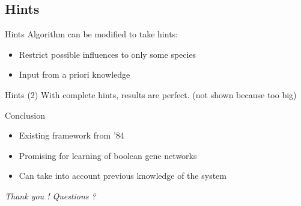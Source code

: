\documentclass{beamer}
\begin{document}
\subsection{Hints}
\begin{frame}{Hints}
	Algorithm can be modified to take hints:
	\begin{itemize}
		\item Restrict possible influences to only some species
		\item Input from a priori knowledge
	\end{itemize}
\end{frame}
\begin{frame}{Hints (2)}
	With complete hints, results are perfect. (not shown because too big)
\end{frame}
\begin{frame}{Conclusion}
\begin{itemize}
	\item Existing framework from '84
	\item Promising for learning of boolean gene networks
	\item Can take into account previous knowledge of the system
\end{itemize}

\centering
\textit{Thank you ! Questions ?}
\end{frame}
\end{document}
